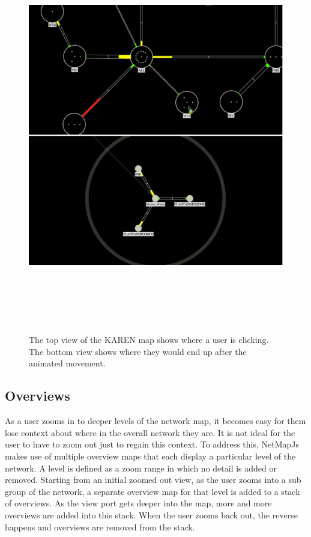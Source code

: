 \documentclass[11pt, a4paper]{article}
\begin{document}
\begin{figure}
\centering
\includegraphics[width=170mm,height=173.22mm]{assets/nav1-2.eps}
\caption{The top view of the KAREN map shows where a user is clicking. The bottom
view shows where they would end up after the animated movement.}
\label{fig:nav1.2}
\end{figure}

\subsection{Overviews}
\label{sec:overviews.vis}

As a user zooms in to deeper levels of the network map, it becomes easy for them
lose context about where in the overall network they are. It is not ideal
for the user to have to zoom out just to regain this context. To address this,
NetMapJs makes use of multiple overview maps that each display a particular
level of the network. A level is defined as a zoom range in which no detail is
added or removed. Starting from an initial zoomed out view, as the user zooms
into a sub group of the network, a separate overview map for that level is added
to a stack of overviews. As the view port gets deeper into the map, more and
more overviews are added into this stack. When the user zooms back out, the
reverse happens and overviews are removed from the stack.
\end{document}
